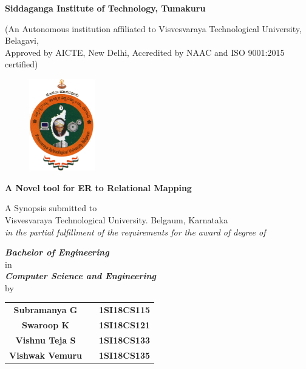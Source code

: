 \begin{titlingpage}

\thispagestyle{empty}
\centering

\setlength{\toptafiddle}{1in}
\setlength{\bottafiddle}{1in}

\vspace*{-0.75in}
\enlargethispage{\toptafiddle}

\begin{LARGE}
\textbf{Siddaganga Institute of Technology, Tumakuru}\\
\end{LARGE}

\begin{small}

(An Autonomous institution affiliated to Visvesvaraya Technological University, Belagavi,\\ Approved by AICTE, New Delhi, Accredited by NAAC and ISO 9001:2015 certified)
\end{small}

\begin{figure}[h]
    \centering
    \includegraphics[height=4cm]{images/vtu.png}
\end{figure}

\vfill
\huge{\textbf{\textcolor{therablue}{A Novel tool for ER to Relational Mapping}}}\\
\vfill

\begin{small}
A Synopsis submitted to \\Visvesvaraya Technological University. Belgaum, Karnataka \\
\textit{in the partial fulfillment of the requirements for the award of degree of} \\
\end{small}
\begin{normalsize}
\textbf{\textit{Bachelor of Engineering }} \\
in \\
\textbf{\textit{Computer Science and Engineering}} \\
by \\
\end{normalsize}
\vfill
\begin{tabular}{ccc}
\textbf{Subramanya G}&  & \textbf{1SI18CS115}\\
\textbf{Swaroop K}&  & \textbf{1SI18CS121}\\
\textbf{Vishnu Teja S}&  & \textbf{1SI18CS133}\\
\textbf{Vishwak Vemuru}&  & \textbf{1SI18CS135}\\
\end{tabular}
\vfill


\end{titlingpage}
